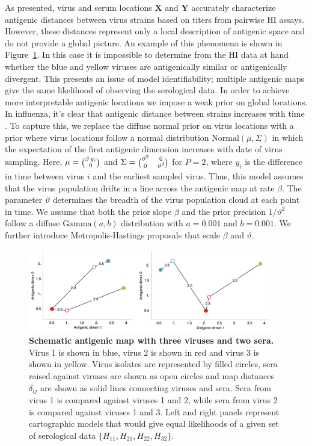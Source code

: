 \documentclass[11pt,oneside,letterpaper]{article}
\newcommand{\driftsd}{\vartheta}					%
\newcommand{\twomatrix}[2]{\scriptsize \Big( \begin{matrix} #1 \\ #2 \end{matrix} \Big)}				%
\newcommand{\fourmatrix}[4]{\scriptsize \Big( \begin{matrix} #1 & #2 \\ #3 & #4 \end{matrix} \Big)}		%
\begin{document}
As presented, virus and serum locations $\mathbf{X}$ and $\mathbf{Y}$ accurately characterize antigenic distances between virus strains based on titers from pairwise HI assays.
However, these distances represent only a local description of antigenic space and do not provide a global picture.
An example of this phenomena is shown in Figure~\ref{schematic_map}.
In this case it is impossible to determine from the HI data at hand whether the blue and yellow viruses are antigenically similar or antigenically divergent. 
This presents an issue of model identifiability; multiple antigenic maps give the same likelihood of observing the serological data.
In order to achieve more interpretable antigenic locations we impose a weak prior on global locations.
In influenza, it's clear that antigenic distance between strains increases with time \cite{Smith04,Cai10}.
To capture this, we replace the diffuse normal prior on virus locations with a prior where virus locations follow a normal distribution $\mathrm{Normal}(\mu,\Sigma)$ in which the expectation of the first antigenic dimension increases with date of virus sampling.
Here, $\mu = \twomatrix{\beta \, y_i}{0}$ and $\Sigma = \fourmatrix{\driftsd^2}{0}{0}{\driftsd^2}$ for $P=2$, where $y_i$ is the difference in time between virus $i$ and the earliest sampled virus.
Thus, this model assumes that the virus population drifts in a line across the antigenic map at rate $\beta$.
The parameter $\driftsd$ determines the breadth of the virus population cloud at each point in time.
We assume that both the prior slope $\beta$ and the prior precision $1/\driftsd^2$ follow a diffuse $\mbox{Gamma}(a, b)$ distribution with $a=0.001$ and $b=0.001$.
We further introduce Metropolis-Hastings proposals that scale $\beta$ and $\driftsd$.

\begin{figure}[tb]
	\centering		
	\includegraphics[width=0.95\textwidth]{figures/schematic_map}
	\caption{\textbf{Schematic antigenic map with three viruses and two sera.} 
	Virus 1 is shown in blue, virus 2 is shown in red and virus 3 is shown in yellow.
	Virus isolates are represented by filled circles, sera raised against viruses are shown as open circles and map distances $\delta_{ij}$ are shown as solid lines connecting viruses and sera.
	Sera from virus 1 is compared against viruses 1 and 2, while sera from virus 2 is compared against viruses 1 and 3.
	Left and right panels represent cartographic models that would give equal likelihoods of a given set of serological data $\{H_{11},H_{21},H_{22},H_{32}\}$.
	} 
	\label{schematic_map} 
\end{figure}
\end{document}
